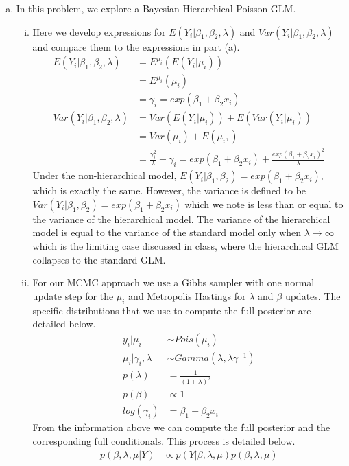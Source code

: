\documentclass[12pt]{article}
\begin{document}
\begin{enumerate}[(a)]
\item In this problem, we explore a Bayesian Hierarchical Poisson GLM.  
\begin{enumerate}[(i)]
	\item Here we develop expressions for $E(Y_i| \beta_1, \beta_2, \lambda)$ and $Var(Y_i| \beta_1, \beta_2, \lambda)$ and compare them to the expressions in part (a). 
	\begin{align*}
	E(Y_i| \beta_1, \beta_2, \lambda) &= E^{\mu_i}(E(Y_i|\mu_i)) \\
	&= E^{\mu_i}(\mu_i) \\
	&= \gamma_i = exp(\beta_1 + \beta_2 x_i) \\
	Var(Y_i| \beta_1, \beta_2, \lambda) &= Var(E(Y_i|\mu_i)) + E(Var(Y_i|\mu_i))  \\
	&= Var(\mu_i) + E(\mu_i,) \\
	&= \frac{\gamma_i^2}{\lambda}+\gamma_i = exp(\beta_1 + \beta_2 x_i) + \frac{exp(\beta_1 + \beta_2 x_i)^2}{\lambda}
	\end{align*}
	Under the non-hierarchical model, $E(Y_i| \beta_1, \beta_2) = exp(\beta_1 + \beta_2 x_i)$, which is exactly the same. However, the variance is defined to be $Var(Y_i| \beta_1, \beta_2) = exp(\beta_1 + \beta_2 x_i)$ which we note is less than or equal to the variance of the hierarchical model. The variance of the hierarchical model is equal to the variance of the standard model only when $\lambda \rightarrow \infty$ which is the limiting case discussed in class, where the hierarchical GLM collapses to the standard GLM. 
	\item For our MCMC approach we use a Gibbs sampler with one normal update step for the $\mu_i$ and Metropolis Hastings for $\lambda$ and $\beta$ updates. The specific distributions that we use to compute the full posterior are detailed below. 
	\begin{align*}
	y_i|\mu_i &\sim Pois(\mu_i)  \\
	\mu_i|\gamma_i, \lambda &\sim Gamma(\lambda, \lambda\gamma^{-1}) \\
	p(\lambda) &= \frac{1}{(1+\lambda)^2} \\
	p(\beta) &\propto 1 \\
	log(\gamma_i) &= \beta_1 + \beta_2 x_i
	\end{align*}
	From the information above we can compute the full posterior and the corresponding full conditionals. This process is detailed below. 
	\begin{align*}
	p(\beta, \lambda, \mu|Y) &\propto p(Y|\beta, \lambda, \mu) p(\beta, \lambda, \mu) \\

\end{align*}
\end{enumerate}
\end{enumerate}
\end{document}

